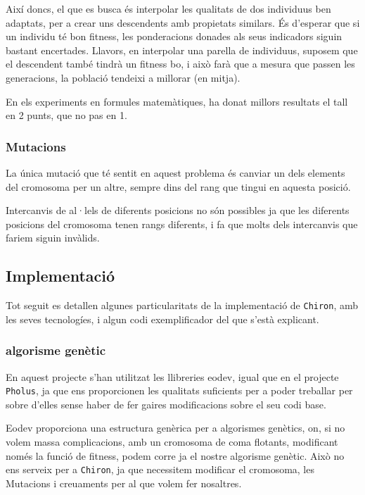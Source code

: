 \documentclass[titlepage,a4paper,12pt]{book}
\begin{document}
Així doncs, el que es busca és interpolar les qualitats de dos individuus ben
adaptats, per a crear uns descendents amb propietats similars.  És d'esperar que
si un individu té bon fitness, les ponderacions donades als seus indicadors
siguin bastant encertades.  Llavors, en interpolar una parella de individuus,
suposem que el descendent també tindrà un fitness bo, i això farà que a mesura
que passen les generacions, la població tendeixi a millorar (en mitja).

En els experiments en formules matemàtiques, ha donat millors resultats el tall
en 2 punts, que no pas en 1.


\subsubsection{Mutacions} %
\label{ssub:Mutacions}

La única mutació que té sentit en aquest problema és canviar un dels elements
del cromosoma per un altre, sempre dins del rang que tingui en aquesta posició.

Intercanvis de al·lels de diferents posicions no són possibles ja que les
diferents posicions del cromosoma tenen rangs diferents, i fa que molts dels
intercanvis que fariem siguin invàlids.


\subsection{Implementació} %
	\label{sub:Implementacio}

Tot seguit es detallen algunes particularitats de la implementació de
\texttt{Chiron}, amb les seves tecnologíes, i algun codi exemplificador del que
s'està explicant.

\subsubsection{algorisme genètic} %
\label{ssub:algorisme genetic}

En aquest projecte s'han utilitzat les llibreries eodev, igual que en el
projecte \texttt{Pholus}, ja que ens proporcionen les qualitats suficients per a
poder treballar per sobre d'elles sense haber de fer gaires modificacions sobre
el seu codi base.

Eodev proporciona una estructura genèrica per a algorismes genètics, on, si no
volem massa complicacions, amb un cromosoma de coma flotants, modificant només
la funció de fitness, podem corre ja el nostre algorisme genètic.  Això no ens
serveix per a \texttt{Chiron}, ja que necessitem modificar el cromosoma, les
Mutacions i creuaments per al que volem fer nosaltres.
\end{document}
